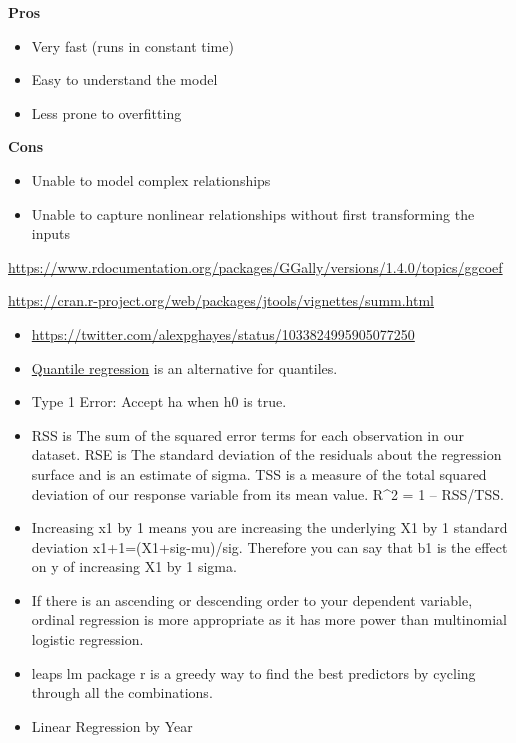 \documentclass[]{book}
\begin{document}
\textbf{Pros}

\begin{itemize}
\item
  Very fast (runs in constant time)
\item
  Easy to understand the model
\item
  Less prone to overfitting
\end{itemize}

\textbf{Cons}

\begin{itemize}
\item
  Unable to model complex relationships
\item
  Unable to capture nonlinear relationships without first transforming the inputs
\end{itemize}

\url{https://www.rdocumentation.org/packages/GGally/versions/1.4.0/topics/ggcoef}

\url{https://cran.r-project.org/web/packages/jtools/vignettes/summ.html}

\begin{itemize}
\item
  \url{https://twitter.com/alexpghayes/status/1033824995905077250}
\item
  \href{https://en.wikipedia.org/wiki/Quantile_regression}{Quantile regression} is an alternative for quantiles.
\item
  Type 1 Error: Accept ha when h0 is true.
\item
  RSS is The sum of the squared error terms for each observation in our dataset. RSE is The standard deviation of the residuals about the regression surface and is an estimate of sigma. TSS is a measure of the total squared deviation of our response variable from its mean value. R\^{}2 = 1 -- RSS/TSS.
\item
  Increasing x1 by 1 means you are increasing the underlying X1 by 1 standard deviation x1+1=(X1+sig-mu)/sig. Therefore you can say that b1 is the effect on y of increasing X1 by 1 sigma.
\item
  If there is an ascending or descending order to your dependent variable, ordinal regression is more appropriate as it has more power than multinomial logistic regression.
\item
  leaps lm package r is a greedy way to find the best predictors by cycling through all the combinations.
\item
  Linear Regression by Year
\end{itemize}
\end{document}
